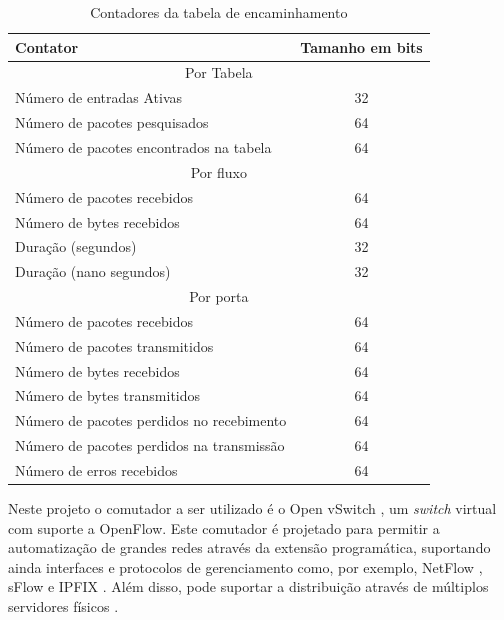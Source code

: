 \begin{table}[H]
  \centering
  \caption{Contadores da tabela de encaminhamento}
  \begin{tabular}{|l|c|} \hline
	\textbf{Contator} & \textbf{Tamanho em bits} \\ \hline
	\multicolumn{2}{|c|}{Por Tabela} \\ \hline
	Número de entradas Ativas & 32 \\ \hline
	Número de pacotes pesquisados & 64 \\ \hline
	Número de pacotes encontrados na tabela & 64 \\ \hline
	\multicolumn{2}{|c|}{Por fluxo} \\ \hline
	Número de pacotes recebidos & 64 \\ \hline
	Número de bytes recebidos & 64 \\ \hline
	Duração (segundos) & 32 \\ \hline
	Duração (nano segundos) & 32 \\ \hline
	\multicolumn{2}{|c|}{Por porta} \\ \hline
	Número de pacotes recebidos & 64 \\ \hline
	Número de pacotes transmitidos & 64 \\ \hline
	Número de bytes recebidos & 64 \\ \hline
	Número de bytes transmitidos & 64 \\ \hline
	Número de pacotes perdidos no recebimento & 64 \\ \hline
	Número de pacotes perdidos na transmissão & 64 \\ \hline
	Número de erros recebidos & 64 \\ \hline
  \end{tabular}
  \label{tab:contadores}
\end{table}

Neste projeto o comutador a ser utilizado é o Open vSwitch \cite{website:ovs}, um \textit{switch} virtual com suporte a OpenFlow. Este comutador é projetado para permitir a automatização de grandes redes através da extensão programática, suportando ainda interfaces e protocolos de gerenciamento como, por exemplo, NetFlow \cite{rfc3954}, sFlow \cite{rfc3176} e IPFIX \cite{rfc5153}. Além disso, pode suportar a distribuição através de múltiplos servidores físicos \cite{website:ovs}.

